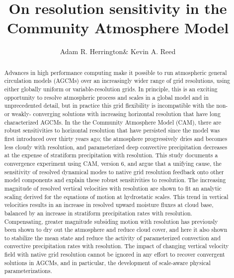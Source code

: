 \documentclass[times]{qjrms4}
\begin{document}

\title{On resolution sensitivity in the Community Atmosphere Model}

\author{Adam R. Herrington\corrauth \& Kevin A. Reed}
\address{School of Marine and Atmospheric Sciences, Stony Brook University, Stony Brook, NY 11794}


\begin{abstract}
Advances in high performance computing make it possible to run atmospheric general circulation models (AGCMs) over an increasingly wider range of grid resolutions, using either globally uniform or variable-resolution grids. In principle, this is an exciting opportunity to resolve atmospheric process and scales in a global model and in unprecedented detail, but in practice this grid flexibility is incompatible with the non- or weakly- converging solutions with increasing horizontal resolution that have long characterized AGCMs. In the the Community Atmosphere Model (CAM), there are robust sensitivities to horizontal resolution that have persisted since the model was first introduced over thirty years ago; the atmosphere progressively dries and becomes less cloudy with resolution, and parameterized deep convective precipitation decreases at the expense of stratiform precipitation with resolution. This study documents a convergence experiment using CAM, version 6, and argue that a unifying cause, the sensitivity of resolved dynamical modes to native grid resolution feedback onto other model components and explain these robust sensitivities to resolution. The increasing magnitude of resolved vertical velocities with resolution are shown to fit an analytic scaling derived for the equations of motion at hydrostatic scales. This trend in vertical velocities results in an increase in resolved upward moisture fluxes at cloud base, balanced by an increase in stratiform precipitation rates with resolution. Compensating, greater magnitude subsiding motion with resolution has previously been shown to dry out the atmosphere and reduce cloud cover, and here it also shown to stabilize the mean state and reduce the activity of parameterized convection and convective precipitation rates with resolution. The impact of changing vertical velocity field with native grid resolution cannot be ignored in any effort to recover convergent solutions in AGCMs, and in particular, the development of scale-aware physical parameterizations.
\end{abstract}
\end{document}
